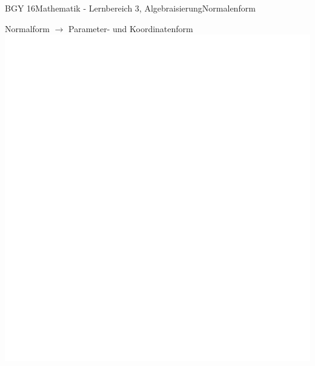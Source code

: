 \documentclass[oneside,openany,headings=optiontotoc,11pt,numbers=noenddot]{scrreprt}
\begin{document}
\begin{worksheet}{BGY 16}{Mathematik - Lernbereich 3, Algebraisierung}{Normalenform}
\begin{framed}
		\end{framed}
		\begin{framed}
			\tiny{\color{codegray}Normalform \(\rightarrow\) Parameter- und Koordinatenform}\\
			\includegraphics[scale=1.15]{../empty.jpg}
		\end{framed}
	\end{worksheet}
\end{document}
